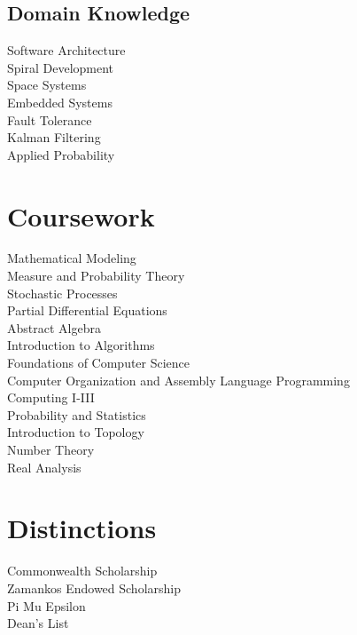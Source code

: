 \documentclass[11pt]{deedy-resume-openfont}
\begin{document}
\begin{minipage}[t]{0.33\textwidth}
\subsection{Domain Knowledge}
\textbullet{} Software Architecture \\ 
\textbullet{} Spiral Development \\  
\textbullet{} Space Systems \\ 
\textbullet{} Embedded Systems \\ 
\textbullet{} Fault Tolerance \\ 
\textbullet{} Kalman Filtering \\ 
\textbullet{} Applied Probability 
\sectionsep



\section{Coursework}
\textbullet{} Mathematical Modeling \\
\textbullet{} Measure and Probability Theory \\
\textbullet{} Stochastic Processes \\ 
\textbullet{} Partial Differential Equations \\
\textbullet{} Abstract Algebra \\ 
\textbullet{} Introduction to Algorithms \\
\textbullet{} Foundations of Computer Science \\
\textbullet{} Computer Organization and Assembly Language Programming \\
\textbullet{} Computing I-III \\
\textbullet{} Probability and Statistics \\
\textbullet{} Introduction to Topology \\ 
\textbullet{} Number Theory \\
\textbullet{} Real Analysis
\sectionsep



\section{Distinctions}
\textbullet{} Commonwealth Scholarship \\ 
\textbullet{} Zamankos Endowed Scholarship  \\
\textbullet{} Pi Mu Epsilon \\ 
\textbullet{} Dean's List \\

%
%

\end{minipage} 
\end{document}
